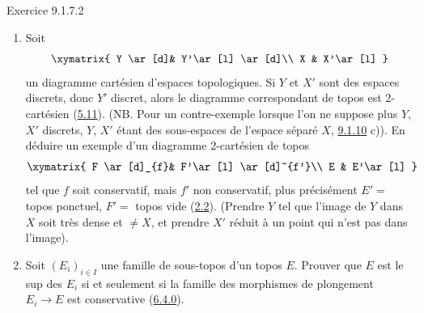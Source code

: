 \documentclass[10pt]{../fichiers-configuration-latex/smfart}
\begin{document}
\begin{enonce*}[remark]{Exercice 9.1.7.2}
\begin{enumerate}
\item Soit\pageoriginale
\[
\xymatrix{
Y \ar[d]& Y'\ar[l] \ar[d]\\
X & X'\ar[l] }
\]
un diagramme cartésien d'espaces topologiques. Si $Y$ et $X'$ sont
des espaces discrets, donc $Y'$ discret, alors le diagramme
correspondant de topos est 2-cartésien (\hyperref[IV.prop5.11]{5.11}). (NB.
Pour un contre-exemple lorsque l'on ne suppose plus $Y$, $X'$
discrets, $Y$, $X'$ étant des sous-espaces de l'espace séparé $X$,
\cf \hyperref[IV.exer9.1.10]{9.1.10} c)). En déduire un exemple d'un diagramme
2-cartésien de topos
\[
\xymatrix{
F \ar[d]_{f}& F'\ar[l] \ar[d]^{f'}\\
E & E'\ar[l] }
\]
tel que $f$ soit conservatif, mais $f'$ non conservatif, plus
précisément $E'=$ topos ponctuel, $F'=$ topos vide
(\hyperref[IV.subsec2.2]{2.2}). (Prendre $Y$ tel que l'image de $Y$ dans $X$
soit très dense et $\neq X$, et prendre $X'$ réduit à un point qui
n'est pas dans l'image).

\item Soit $(E_i)_{i\in I}$ une famille de sous-topos d'un topos
$E$. Prouver que $E$ est le sup des $E_i$ si et seulement si la
famille des morphismes de plongement $E_i\rightarrow E$ est
conservative (\hyperref[IV.subsubsec6.4.0]{6.4.0}).
\end{enumerate}
\end{enonce*}
\end{document}
